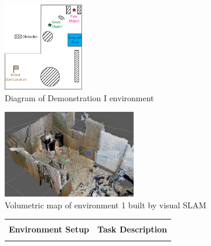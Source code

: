 \documentclass[12pt]{article}
\begin{document}
\begin{figure}[H]
  \begin{subfigure}{0.5\columnwidth}
  \begin{center}
  \includegraphics[height=1.5in]{images/RSSMap.png}
  \caption{Diagram of Demonstration I environment}
  \label{fig:map}
  \end{center}
  \end{subfigure}
  \begin{subfigure}{0.5\columnwidth}
  \begin{center}
  \includegraphics[height=1.5in]{images/map4.jpg}
  \caption{Volumetric map of environment 1 built by visual SLAM}
  \label{fig:octomap}
  \end{center}
  \end{subfigure}
  \newcommand{\Lwidth}{0.4\columnwidth}
  \newcommand{\Rwidth}{0.4\columnwidth}
  \newcommand{\Rboxheight}{-0.5\height}
  \setlength{\tabcolsep}{4pt} %
  \begin{subfigure}{\columnwidth}
  \centering
  \begin{tabular}{|c|c|}
  \hline
   & \vspace{-5pt}\\

  \textbf{Environment Setup} & \textbf{Task Description}\\

  \hline
   & \vspace{-5pt}\\
   

\end{tabular}
\end{subfigure}
\end{figure}
\end{document}
